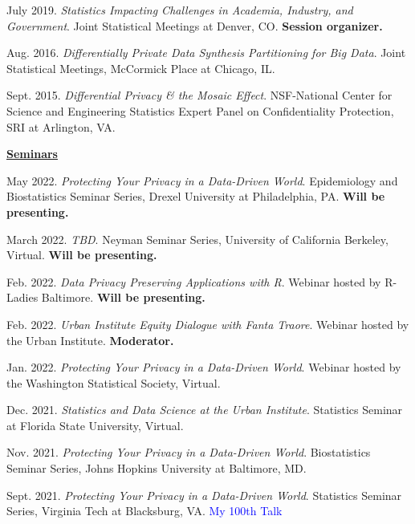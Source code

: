 \documentclass[11pt, letterpaper, roman]{moderncv} %
\begin{document}
\begin{etaremune}[topsep=0pt, itemsep=3pt, partopsep=0pt, parsep=0pt]
    \item July 2019. \textit{Statistics Impacting Challenges in Academia, Industry, and Government}. Joint Statistical Meetings at Denver, CO. \textbf{Session organizer.}

    \item Aug. 2016. \textit{Differentially Private Data Synthesis Partitioning for Big Data}. Joint Statistical Meetings, McCormick Place at Chicago, IL.
    
    \item Sept. 2015. \textit{Differential Privacy \& the Mosaic Effect}. NSF-National Center for Science and Engineering Statistics Expert Panel on Confidentiality Protection, SRI at Arlington, VA.

\vspace{6pt}
\hspace{-0.30in}\underline{\textbf{\large Seminars}}\normalsize
    \item May 2022. \textit{Protecting Your Privacy in a Data-Driven World}. Epidemiology and Biostatistics Seminar Series, Drexel University at Philadelphia, PA. \textbf{Will be presenting.}
    
    \item March 2022. \textit{TBD}. Neyman Seminar Series, University of California Berkeley, Virtual. \textbf{Will be presenting.}
    
    \item Feb. 2022. \textit{Data Privacy Preserving Applications with R}. Webinar hosted by R-Ladies Baltimore. \textbf{Will be presenting.}
    
    \item Feb. 2022. \textit{Urban Institute Equity Dialogue with Fanta Traore}. Webinar hosted by the Urban Institute. \textbf{Moderator.}
    
    \item Jan. 2022. \textit{Protecting Your Privacy in a Data-Driven World}. Webinar hosted by the Washington Statistical Society, Virtual.
    
    \item Dec. 2021. \textit{Statistics and Data Science at the Urban Institute}. Statistics Seminar at Florida State University, Virtual.
    
    \item Nov. 2021. \textit{Protecting Your Privacy in a Data-Driven World}. Biostatistics Seminar Series, Johns Hopkins University at Baltimore, MD.
    
    \item Sept. 2021. \textit{Protecting Your Privacy in a Data-Driven World}. Statistics Seminar Series, Virginia Tech at Blacksburg, VA. \textcolor{blue}{My 100th Talk}
    

\end{etaremune}
\end{document}
